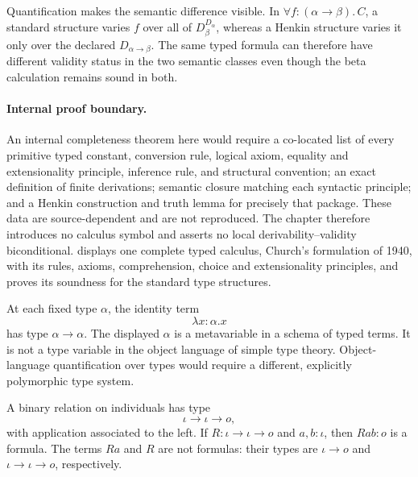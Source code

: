 Quantification makes the semantic difference visible.  In
\(\forall f{:}(\alpha\to\beta).\,C\), a standard structure varies \(f\) over
all of \(D_\beta^{D_\alpha}\), whereas a Henkin structure varies it only over
the declared \(D_{\alpha\to\beta}\).  The same typed formula can therefore
have different validity status in the two semantic classes even though the
beta calculation remains sound in both.

\paragraph{Internal proof boundary.}
An internal completeness theorem here would require a co-located list of every
primitive typed constant, conversion rule, logical axiom, equality and
extensionality principle, inference rule, and structural convention; an exact
definition of finite derivations; semantic closure matching each syntactic
principle; and a Henkin construction and truth lemma for precisely that
package.  These data are source-dependent and are not reproduced.  The chapter
therefore introduces no calculus symbol and asserts no local
derivability--validity biconditional.
 displays one complete typed calculus,
Church's formulation of 1940, with its rules, axioms, comprehension,
choice and extensionality principles, and proves its soundness for the
standard type structures.

\begin{example}
At each fixed type \(\alpha\), the identity term
\[
  \lambda x{:}\alpha.x
\]
has type \(\alpha\to\alpha\).  The displayed \(\alpha\) is a metavariable in a
schema of typed terms.  It is not a type variable in the object language of
simple type theory.  Object-language quantification over types would require a
different, explicitly polymorphic type system.
\end{example}

\begin{example}
A binary relation on individuals has type
\[
  \iota\to\iota\to o,
\]
with application associated to the left.  If
\(R:\iota\to\iota\to o\) and \(a,b:\iota\), then \(Rab:o\) is a formula.
The terms \(Ra\) and \(R\) are not formulas: their types are
\(\iota\to o\) and \(\iota\to\iota\to o\), respectively.
\end{example}

